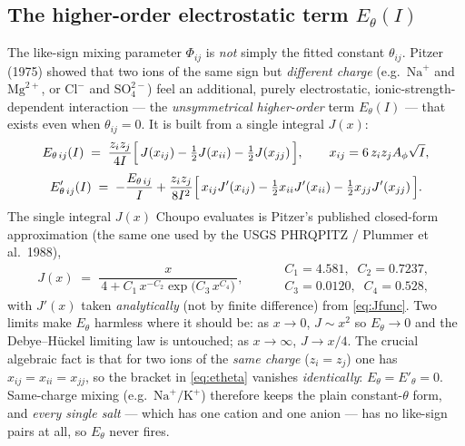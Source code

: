\documentclass[11pt,a4paper]{article}
\begin{document}
\subsection{The higher-order electrostatic term
\texorpdfstring{$E_\theta(I)$}{E theta}}\label{sec:hmw-etheta}

The like-sign mixing parameter $\Phi_{ij}$ is \emph{not} simply the
fitted constant $\theta_{ij}$.  Pitzer (1975) \cite{Pitzer1975} showed
that two ions of the same sign but \emph{different charge} (e.g.\
$\text{Na}^+$ and $\text{Mg}^{2+}$, or $\text{Cl}^-$ and
$\text{SO}_4^{2-}$) feel an additional, purely electrostatic,
ionic-strength-dependent interaction --- the \emph{unsymmetrical
higher-order} term $E_\theta(I)$ --- that exists even when
$\theta_{ij}=0$.  It is built from a single integral $J(x)$:
\begin{equation}
   E_{\theta\,ij}(I) \;=\;
   \frac{z_i z_j}{4I}\Bigl[\,J(x_{ij}) - \tfrac12 J(x_{ii})
     - \tfrac12 J(x_{jj})\,\Bigr],
   \qquad x_{ij} = 6\,z_i z_j A_\phi\sqrt I,
   \label{eq:etheta}
\end{equation}
\begin{equation}
   E'_{\theta\,ij}(I) \;=\;
   -\frac{E_{\theta\,ij}}{I}
   + \frac{z_i z_j}{8I^2}\Bigl[\,x_{ij}J'(x_{ij})
     - \tfrac12 x_{ii}J'(x_{ii}) - \tfrac12 x_{jj}J'(x_{jj})\,\Bigr].
   \label{eq:etheta-prime}
\end{equation}
The single integral $J(x)$ Choupo evaluates is Pitzer's published
closed-form approximation (the same one used by the USGS PHRQPITZ /
Plummer et al.\ 1988),
\begin{equation}
   J(x) \;=\; \frac{x}{\,4 + C_1\,x^{-C_2}\exp\!\bigl(C_3\,x^{C_4}\bigr)\,},
   \qquad
   \begin{aligned}
     &C_1=4.581,\;\; C_2=0.7237,\\
     &C_3=0.0120,\;\; C_4=0.528,
   \end{aligned}
   \label{eq:Jfunc}
\end{equation}
with $J'(x)$ taken \emph{analytically} (not by finite difference) from
\eqref{eq:Jfunc}.  Two limits make $E_\theta$ harmless where it should
be: as $x\to0$, $J\sim x^2$ so $E_\theta\to0$ and the Debye--H\"uckel
limiting law is untouched; as $x\to\infty$, $J\to x/4$.  The crucial
algebraic fact is that for two ions of the \emph{same charge}
($z_i=z_j$) one has $x_{ij}=x_{ii}=x_{jj}$, so the bracket in
\eqref{eq:etheta} vanishes \emph{identically}: $E_\theta=E'_\theta=0$.
Same-charge mixing (e.g.\ $\text{Na}^+/\text{K}^+$) therefore keeps the
plain constant-$\theta$ form, and \emph{every single salt} --- which has
one cation and one anion --- has no like-sign pairs at all, so $E_\theta$
never fires.
\end{document}
